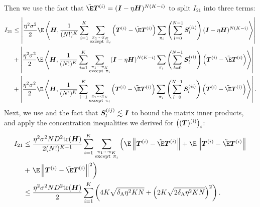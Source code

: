 Then we use the fact that $\fakeE\mT^{(i)}=(\mI-\eta\mH)^{N(K-i)}$ to split $I_{21}$ into three terms:
\begin{align*}
    I_{21}&\leq\left|\frac{\eta^2\sigma^2}{2}\E\inp{\mH}{\frac{1}{(N!)^K}\sum_{i=1}^K\sum_{\substack{\pi_1\cdots \pi_K \\ \text{except} ~\pi_i}}\left(\mT^{(i)}-\fakeE\mT^{(i)}\right)\sum_{\pi_i}\left(\sum_{l=0}^{N-1}\mS_l^{(ii)}\right)(\mI-\eta\mH)^{N(K-i)}}\right| \\
    &+\left|\frac{\eta^2\sigma^2}{2}\E\inp{\mH}{\frac{1}{(N!)^K}\sum_{i=1}^K\sum_{\substack{\pi_1\cdots \pi_K \\ \text{except} ~\pi_i}}(\mI-\eta\mH)^{N(K-i)}\sum_{\pi_i}\left(\sum_{l=0}^{N-1}\mS_l^{(ii)}\right)\left(\mT^{(i)}-\fakeE\mT^{(i)}\right)}\right| \\
    &+\left|\frac{\eta^2\sigma^2}{2}\E\inp{\mH}{\frac{1}{(N!)^K}\sum_{i=1}^K\sum_{\substack{\pi_1\cdots \pi_K \\ \text{except} ~\pi_i}}\left(\mT^{(i)}-\fakeE\mT^{(i)}\right)\sum_{\pi_i}\left(\sum_{l=0}^{N-1}\mS_l^{(ii)}\right)\left(\mT^{(i)}-\fakeE\mT^{(i)}\right)}\right|. \\
\end{align*}
Next, we use  and the fact that ${\bm{S}}_l^{(ij)}\lesssim{\bm{I}}$ to bound the matrix inner products, and apply the concentration inequalities we derived for $\left(({\bm{T}})^{(i)}\right)_i$:
\begin{align*}
    I_{21}&\leq \frac{\eta^2\sigma^2ND^2\text{tr}(\mH)}{2(N!)^{K-1}}\sum_{i=1}^K\sum_{\substack{\pi_1\cdots \pi_K \\ \text{except} ~\pi_i}}\left(\E\left\|\mT^{(i)}-\fakeE\mT^{(i)}\right\|+\E\left\|\mT^{(i)}-\fakeE\mT^{(i)}\right\|\right. \\
    &+\left.\E\left\|\mT^{(i)}-\fakeE\mT^{(i)}\right\|^2\right) \\
    &\leq\frac{\eta^2\sigma^2ND^2\text{tr}(\mH)}{2}\sum_{i=1}^K\left(4K\sqrt{\deltaA\eta^2KN}+\left(2K\sqrt{2\deltaA\eta^2KN}\right)^2\right).
\end{align*}
